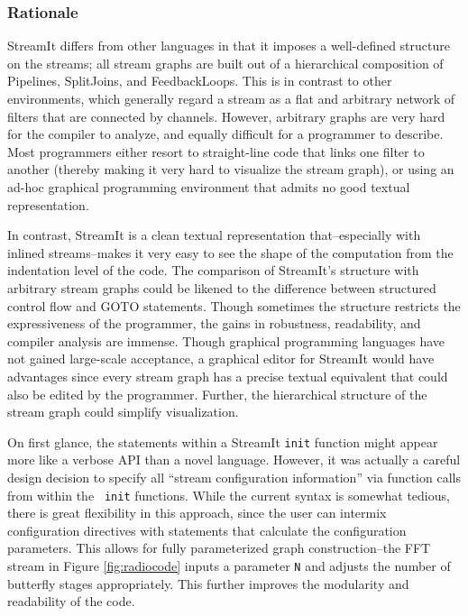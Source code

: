 \subsubsection{Rationale}

StreamIt differs from other languages in that it imposes a well-defined
structure on the streams; all stream graphs are built out of a
hierarchical composition of Pipelines, SplitJoins, and FeedbackLoops.
This is in contrast to other environments, which generally regard a
stream as a flat and arbitrary network of filters that are connected by
channels.  However, arbitrary graphs are very hard for the compiler to
analyze, and equally difficult for a programmer to describe.  Most
programmers either resort to straight-line code that links one filter to
another (thereby making it very hard to visualize the stream graph), or
using an ad-hoc graphical programming environment that admits no good
textual representation.

In contrast, StreamIt is a clean textual representation
that--especially with inlined streams--makes it very easy to see the
shape of the computation from the indentation level of the code.  The
comparison of StreamIt's structure with arbitrary stream graphs could
be likened to the difference between structured control flow and GOTO
statements.  Though sometimes the structure restricts the
expressiveness of the programmer, the gains in robustness,
readability, and compiler analysis are immense.  Though graphical
programming languages have not gained large-scale acceptance, a
graphical editor for StreamIt would have advantages since every stream
graph has a precise textual equivalent that could also be edited by
the programmer.  Further, the hierarchical structure of the stream
graph could simplify visualization.

On first glance, the statements within a StreamIt {\tt init} function
might appear more like a verbose API than a novel language.  However,
it was actually a careful design decision to specify all ``stream
configuration information'' via function calls from within the {\tt
init} functions.  While the current syntax is somewhat tedious, there
is great flexibility in this approach, since the user can intermix
configuration directives with statements that calculate the
configuration parameters.  This allows for fully parameterized graph
construction--the FFT stream in Figure \ref{fig:radiocode} inputs a
parameter {\tt N} and adjusts the number of butterfly stages
appropriately.  This further improves the modularity and readability
of the code.

